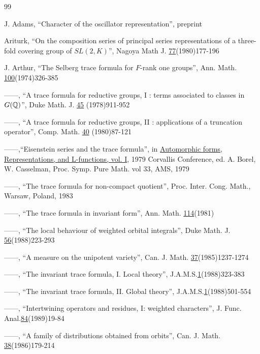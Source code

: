 


\begin{thebibliography}{99}

 J. Adams, ``Character of the oscillator representation'',
preprint

 Ariturk, ``On the composition series of principal series
representations of a three-fold covering group of $SL(2,K)$'', Nagoya Math
J. \underline{77}(1980)177-196

 J. Arthur,
``The Selberg trace formula for $F$-rank one groups'', Ann.
Math. \underline{100}(1974)326-385

 ------,
``A trace formula for reductive groups, I : terms associated to
classes in $G(\Bbb{Q})$'', Duke Math. J. \underline{45} (1978)911-952

  ------,
``A trace formula for reductive groups, II : applications of a
truncation operator'', Comp. Math. \underline{40} (1980)87-121

 ------,``Eisenstein series and the trace formula'', in
\underline{Automorphic forms, }
\underline{Representations, } \underline{and
L-functions, vol. I}, 1979 Corvallis Conference, ed. A. Borel, W. Casselman,
Proc. Symp. Pure Math. vol 33, AMS, 1979 

 ------,
``The trace formula for non-compact quotient'', Proc. Inter.
Cong. Math., Warsaw, Poland, 1983 

 ------, ``The trace formula in invariant form'', Ann. Math.
\underline{114}(1981)
 
 ------, ``The local behaviour of weighted orbital integrals'', 
Duke Math. J. \underline{56}(1988)223-293

 ------, ``A measure on the unipotent variety'', Can. J. Math. 
\underline{37}(1985)1237-1274

 ------, ``The invariant trace formula, I. Local theory'',
J.A.M.S.\underline{1}(1988)323-383

 ------, ``The invariant trace formula, II. Global theory'',
J.A.M.S.\underline{1}(1988)501-554

 ------, ``Intertwining operators and residues, I: weighted
characters'', J. Func. Anal.\underline{84}(1989)19-84

 ------, ``A family of distributions obtained from 
orbits'', Can. J.
Math. \underline{38}(1986)179-214


\end{thebibliography}
